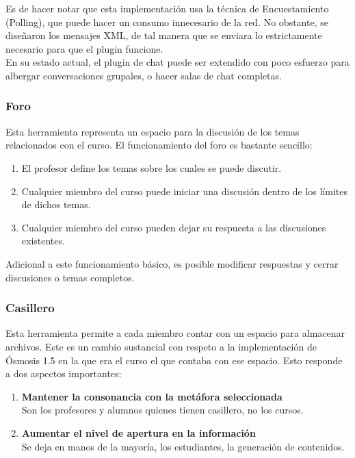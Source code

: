 Es de hacer notar que esta implementación usa la técnica de Encuestamiento (Polling), que puede hacer un consumo innecesario de la red. No obstante, se diseñaron los mensajes XML, de tal manera que se enviara lo estrictamente necesario para que el plugin funcione.\\

En su estado actual, el plugin de chat puede ser extendido con poco esfuerzo para albergar conversaciones grupales, o hacer salas de chat completas.

\subsubsection{Foro}
Esta herramienta representa un espacio para la discusión de los temas relacionados con el curso. El funcionamiento del foro es bastante sencillo:

\begin{enumerate}
	\item El profesor define los temas sobre los cuales se puede discutir.
	\item Cualquier miembro del curso puede iniciar una discusión dentro de los límites de dichos temas.
	\item Cualquier miembro del curso pueden dejar su respuesta a las discusiones existentes.
\end{enumerate}

Adicional a este funcionamiento básico, es posible modificar respuestas y cerrar discusiones o temas completos.

\subsubsection{Casillero}
Esta herramienta permite a cada miembro contar con un espacio para almacenar archivos. Este es un cambio sustancial con respeto a la implementación de Ósmosis 1.5 en la que era el curso el que contaba con ese espacio. Esto responde a dos aspectos importantes:
\begin{enumerate}
	\item \textbf{Mantener la consonancia con la metáfora seleccionada}\\
	Son los profesores y alumnos quienes tienen casillero, no los cursos.
	\item \textbf{Aumentar el nivel de apertura en la información}\\
	Se deja en manos de la mayoría, los estudiantes, la generación de contenidos.
\end{enumerate}

